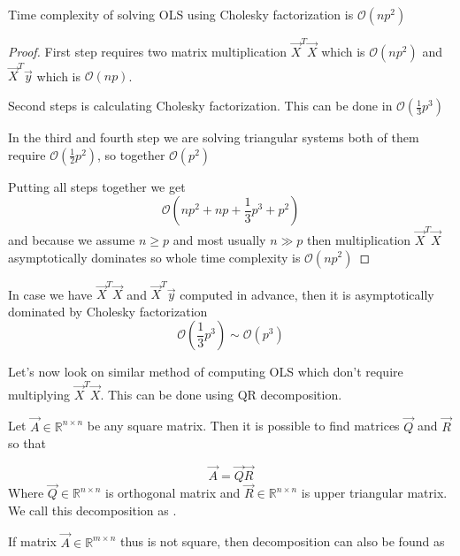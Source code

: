 \begin{observation}
	Time complexity of solving OLS using Cholesky factorization is $\mathcal{O}(np^2)$
\end{observation}
\begin{proof}
	First step requires two matrix multiplication $\vec{X}^T\vec{X}$ which is $\mathcal{O}(np^2)$ and  $\vec{X}^T\vec{y}$ which is $\mathcal{O}(np)$.
	
	Second steps is calculating Cholesky factorization. This can be done in $\mathcal{O}(\frac{1}{3}p^3)$ \cite{krishnamoorthy2013matrix}

	In the third and fourth step we are solving triangular systems both of them require
	 $\mathcal{O}(\frac{1}{2}p^2)$, so together $\mathcal{O}(p^2)$

	Putting all steps together we get  
	\begin{equation} \label{timecholeskywhole}
		\mathcal{O}(np^2 + np + \frac{1}{3}p^3 + p^2)
	\end{equation}
	and because we assume $n \geq p$ and most usually  $n \gg p$ then multiplication $\vec{X}^T\vec{X}$ asymptotically dominates so whole time complexity is $\mathcal{O}(np^2)$
\end{proof}
\begin{note}
	In case we have $\vec{X}^T\vec{X}$ and  $\vec{X}^T\vec{y}$ computed in advance, then it is asymptotically dominated by Cholesky factorization 
	\begin{equation} \label{timecholesky}
		\mathcal{O}(\frac{1}{3}p^3) \sim \mathcal{O}(p^3)
	\end{equation}
\end{note}

Let's now look on similar method of computing OLS which don't require multiplying $\vec{X}^T\vec{X}$. This can be done using QR decomposition.

\begin{definition}
	Let $\vec{A} \in \mathbb{R}^{n \times n}$ be any square matrix. Then it is possible to find matrices $\vec{Q}$ and $\vec{R}$ so that 

	\begin{equation}
		\vec{A} = \vec{Q}\vec{R}
	\end{equation}
	Where $\vec{Q} \in \mathbb{R}^{n \times n}$ is orthogonal matrix and $\vec{R} \in \mathbb{R}^{n \times n}$ is upper triangular matrix. 
	We call this decomposition as .
\end{definition}
If matrix $\vec{A} \in \mathbb{R}^{m \times n}$ thus is not square, then decomposition can also be found as

